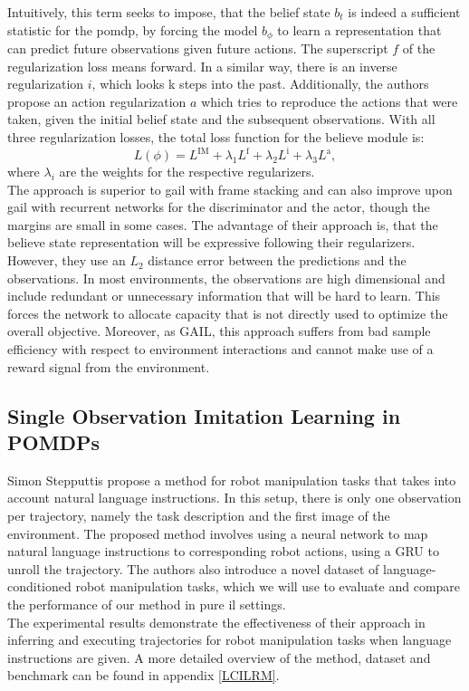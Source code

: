 Intuitively, this term seeks to impose, that the belief state $b_t$ is indeed a sufficient statistic for the 
\ac{pomdp}, by forcing the model $b_{\phi}$ to learn a representation that can predict future observations given future actions. The superscript $f$ of the regularization loss means forward. 
In a similar way, there is an inverse regularization $i$, which looks k steps into the past. Additionally, the authors propose an action regularization $a$ which tries to reproduce the actions that were 
taken, given the initial belief state and the subsequent observations. With all three regularization losses, the total loss function for the believe module is:
\begin{equation}
    L(\phi) = L^\text{IM} + \lambda_1 L^\text{f} + \lambda_2 L^\text{i} + \lambda_3 L^\text{a},
\end{equation}
where $\lambda_i$ are the weights for the respective regularizers. \\
The approach is superior to \ac{gail} with frame stacking and can also improve upon \ac{gail} with recurrent networks for the discriminator and the actor, though the margins are small in some cases. The advantage 
of their approach is, that the believe state representation will be expressive following their regularizers. However, they use an $L_2$ distance error between the predictions and the observations. In most environments, 
the observations are high dimensional and include redundant or unnecessary information that will be hard to learn. This forces the network to allocate capacity that is not directly used to 
optimize the overall objective. Moreover, as GAIL, this approach suffers from bad sample efficiency with respect to environment interactions and cannot make use of a reward signal from the environment. 

\subsection{Single Observation Imitation Learning in POMDPs}
Simon Stepputtis \etAl \cite{stepputtis2020languageconditioned} propose a method for robot manipulation tasks that takes 
into account natural language instructions. 
In this setup, there is only one observation per trajectory, namely the task description and the first image of the environment.
The proposed method involves using a neural network to map natural language instructions to 
corresponding robot actions, using a GRU to unroll the trajectory. The authors also introduce a novel dataset of language-conditioned robot manipulation tasks, which we will use to evaluate 
and compare the performance of our method in pure \ac{il} settings.\\ 
The experimental results demonstrate the effectiveness of their approach in inferring and executing trajectories for robot manipulation 
tasks when language instructions are given. A more detailed overview of the method, dataset and benchmark can be found in appendix \ref{LCILRM}.\\


